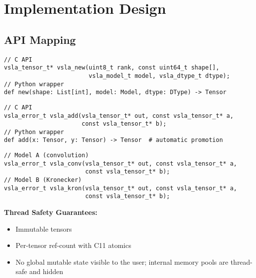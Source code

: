 \section{Implementation Design}
\label{sec:implementation}

\subsection{API Mapping}
\label{sec:api}

\begin{tcolorbox}[colback=api,colframe=green!50!black,title=C Library API (C99/C11)]
\begin{description}[leftmargin=2em]
\item[Tensor Creation:] 
\begin{verbatim}
// C API
vsla_tensor_t* vsla_new(uint8_t rank, const uint64_t shape[], 
                        vsla_model_t model, vsla_dtype_t dtype);
// Python wrapper  
def new(shape: List[int], model: Model, dtype: DType) -> Tensor
\end{verbatim}

\item[Variable-Shape Operations:]
\begin{verbatim}
// C API  
vsla_error_t vsla_add(vsla_tensor_t* out, const vsla_tensor_t* a, 
                      const vsla_tensor_t* b);
// Python wrapper
def add(x: Tensor, y: Tensor) -> Tensor  # automatic promotion
\end{verbatim}

\item[Semiring Products:]
\begin{verbatim}
// Model A (convolution)
vsla_error_t vsla_conv(vsla_tensor_t* out, const vsla_tensor_t* a, 
                       const vsla_tensor_t* b);
// Model B (Kronecker)  
vsla_error_t vsla_kron(vsla_tensor_t* out, const vsla_tensor_t* a,
                       const vsla_tensor_t* b);
\end{verbatim}
\end{description}
\end{tcolorbox}

\textbf{Thread Safety Guarantees:}
\begin{itemize}[leftmargin=1.5em]
    \item Immutable tensors
    \item Per-tensor ref-count with C11 atomics  
    \item No global mutable state visible to the user; internal memory pools are thread-safe and hidden
\end{itemize}

